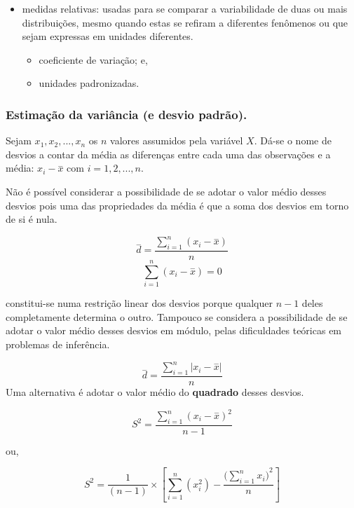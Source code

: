\documentclass[
]{book}
\providecommand{\tightlist}{%
  \setlength{\itemsep}{0pt}\setlength{\parskip}{0pt}}
\begin{document}
\hfill\break

\begin{itemize}
\tightlist
\item
  medidas relativas: usadas para se comparar a variabilidade de duas ou mais distribuições, mesmo quando estas se refiram a diferentes fenômenos ou que sejam expressas em unidades diferentes.

  \begin{itemize}
  \tightlist
  \item
    coeficiente de variação; e,
  \item
    unidades padronizadas.
  \end{itemize}
\end{itemize}

\hypertarget{estimauxe7uxe3o-da-variuxe2ncia-e-desvio-padruxe3o.}{%
\subsubsection{Estimação da variância (e desvio padrão).}\label{estimauxe7uxe3o-da-variuxe2ncia-e-desvio-padruxe3o.}}

Sejam \(x_{1}, x_{2}, ..., x_{n}\) os \(n\) valores assumidos pela variável \(X\). Dá-se o nome de desvios a contar da média as diferenças entre cada uma das observações e a média: \(x_{i} - \stackrel{-}{x}\) com \(i=1,2,...,n\).

Não é possível considerar a possibilidade de se adotar o valor médio desses desvios pois uma das propriedades da média é que a soma dos desvios em torno de si é nula.

\[
\stackrel{-}{d} = \frac{\sum _{i=1}^{n}\left(x_{i}-\stackrel{-}{x}\right)}{n}
\]
\[
\sum _{i=1}^{n}\left(x_{i}-\stackrel{-}{x}\right)=0
\]

constitui-se numa restrição linear dos desvios porque qualquer \(n-1\) deles completamente determina o outro. Tampouco se considera a possibilidade de se adotar o valor médio desses desvios em módulo, pelas dificuldades teóricas em problemas de inferência.

\[
\stackrel{-}{d}  = \frac{\sum _{i=1}^{n}\left|x_{i}-\stackrel{-}{x}\right|}{n}
\]
Uma alternativa é adotar o valor médio do \textbf{quadrado} desses desvios.

\[
S^{2}=\frac{\sum _{i=1}^{n}\left(x_{i}-\stackrel{-}{x}\right)^{2}}{n-1}
\]

ou,

\[
S^{2}=\frac{1}{(n-1)} \times \left[ \sum _{i=1}^{n} (x_{i}^{2}) - \frac{({\sum _{i=1}^{n}x_{i})}^{2} }{n}\right]
\]
\end{document}
